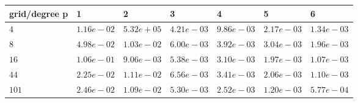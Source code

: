 \begin{tabular}{lllllll}
\hline
 grid/degree p   & 1          & 2          & 3          & 4          & 5          & 6          \\
\hline
 $4$             & $1.16e-02$ & $5.32e+05$ & $4.21e-03$ & $9.86e-03$ & $2.17e-03$ & $1.34e-03$ \\
 $8$             & $4.98e-02$ & $1.03e-02$ & $6.00e-03$ & $3.92e-03$ & $3.04e-03$ & $1.96e-03$ \\
 $16$            & $1.06e-01$ & $9.06e-03$ & $5.38e-03$ & $3.10e-03$ & $1.97e-03$ & $1.07e-03$ \\
 $44$            & $2.25e-02$ & $1.11e-02$ & $6.56e-03$ & $3.41e-03$ & $2.06e-03$ & $1.10e-03$ \\
 $101$           & $2.46e-02$ & $1.09e-02$ & $5.30e-03$ & $2.52e-03$ & $1.20e-03$ & $5.77e-04$ \\
\hline
\end{tabular}